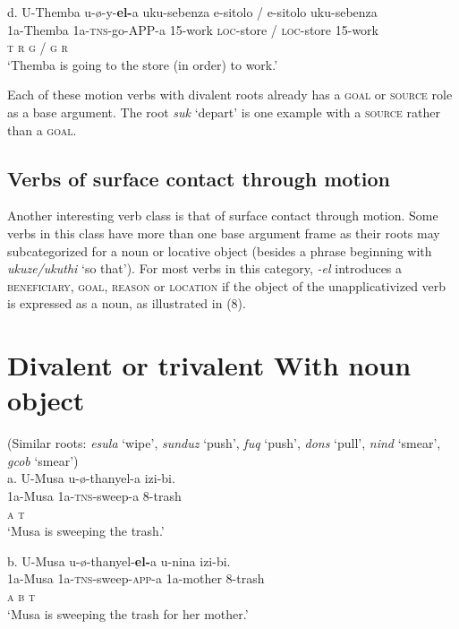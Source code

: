 \gll   d.  U-Themba  u-ø-y-\textbf{el-}a      uku-sebenza  e-sitolo    / e-sitolo    uku-sebenza \\
         1a-Themba  1a-\textsc{tns}{}-go-APP-a    15-work    \textsc{loc}{}-store  / \textsc{loc}{}-store  15-work\\
         \textsc{t                r      g      / g      r}\\
\glt     ‘Themba is going to the store (in order) to work.’
\z

Each of these motion verbs with divalent roots already has a \textsc{goal} or \textsc{source} role as a base argument. The root \textit{suk} ‘depart’ is one example with a \textsc{source} rather than a \textsc{goal}.

\section{Verbs of surface contact through motion}

Another interesting verb class is that of surface contact through motion. Some verbs in this class have more than one base argument frame as their roots may subcategorized for a noun or locative object (besides a phrase beginning with \textit{ukuze/ukuthi} ‘so that’). For most verbs in this category, \textit{{}-el} introduces a \textsc{beneficiary}, \textsc{goal}, \textsc{reason} or \textsc{location} if the object of the unapplicativized verb is expressed as a noun, as illustrated in (8). 

\chapter{Divalent or trivalent With noun object}
     (Similar roots: \textit{esula} ‘wipe’, \textit{sunduz} ‘push’, \textit{fuq} ‘push’, \textit{dons} ‘pull’, \textit{nind} ‘smear’, \textit{gcob} ‘smear’)\\
\gll   a.  U-Musa    u-ø-thanyel-a       izi-bi. \\
         1a-Musa     1a-\textsc{tns}{}-sweep-a   8-trash\\
         \textsc{a                  t}\\
\glt     ‘Musa is sweeping the trash.’
\z

\gll   b.  U-Musa    u-ø-thanyel-\textbf{el-}a         u-nina         izi-bi. \\
         1a-Musa     1a-\textsc{tns}{}-sweep-\textsc{app}{}-a  1a-mother   8-trash\\
         \textsc{a                  b        t}\\
\glt     ‘Musa is sweeping the trash for her mother.’
\z

